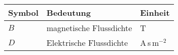 % 
\begin{longtable}[l]{p{3cm}p{8cm}p{2cm}}
\setlength\tabcolsep{5pt}
Symbol & Bedeutung & Einheit \\
\hline
\endhead
\toprule
%
$B$ & magnetische Flussdichte & T \\
$D$ & Elektrische Flussdichte & A\,s\,m$^{-2}$ \\
%
\end{longtable}